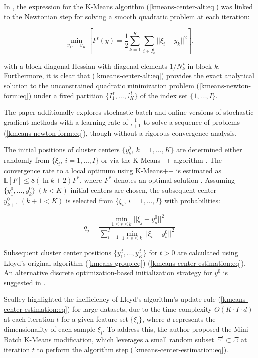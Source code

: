 In \cite{Bottou_1994}, the expression for the K-Means algorithm (\ref{kmeans-center-alt:eq}) was linked to the Newtonian step for solving a smooth quadratic problem at each iteration:

\begin{equation}
    \label{kmeans-newton-form:eq}
    \min_{y_1,\ldots,y_K}\left[F^t(y) = \frac{1}{2} \sum_{k=1}^K \sum_{i \in I_k^t} || \xi_i - y_k ||^2\right].
\end{equation}

\noindent with a block diagonal Hessian with diagonal elements $1/N_k^{\,t}$ in block $k$. Furthermore, it is clear that (\ref{kmeans-center-alt:eq}) provides the exact analytical solution to the unconstrained quadratic minimization problem (\ref{kmeans-newton-form:eq}) under a fixed partition $\{I_1^{\,t},\ldots,I_K^{\,t}\}$ of the index set $\{1,\ldots,I\}$.

The paper additionally explores stochastic batch and online versions of stochastic gradient methods with a learning rate of $\frac{1}{t + 1}$ to solve a sequence of problems (\ref{kmeans-newton-form:eq}), though without a rigorous convergence analysis.

The initial positions of cluster centers $\{ y_k^0, \> k = 1, \ldots, K \}$ are determined either randomly from $\{ \xi_i, \> i = 1, \ldots, I \}$ or via the K-Means++ algorithm \cite{Arthur_Vassilvitskii_2007,Nguyen_Duong_2018}. The convergence rate to a local optimum using K-Means++ is estimated as $\mathbb{E} [F] \leq 8(\ln k + 2 ) F^{*}$, where $F^{*}$ denotes an optimal solution \cite{Arthur_Vassilvitskii_2007}. Assuming $\{ y_1^0, \ldots, y_k^0 \} \> (k<K)$ initial centers are chosen, the subsequent center $y_{k+1}^0 \> (k+1<K)$ is selected from $\{ \xi_i, \> i = 1, \ldots, I \}$ with probabilities:

\begin{equation}
    \label{kmeans-plus-plus-init:eq}
    q_j = \frac{\min_{1 \leq s \leq k} || \xi_j - y_s^0 ||^2}{\sum_{i=1}^I \min_{1 \leq s \leq k} || \xi_i - y_s^0 ||^2}
\end{equation}

Subsequent cluster center positions $\{ y_1^{\,t}, \ldots, y_K^{\,t} \}$ for $t > 0$ are calculated using Lloyd's original algorithm (\ref{kmeans-group:eq})-(\ref{kmeans-center-estimation:eq}). An alternative discrete optimization-based initialization strategy for $y^{0}$ is suggested in \cite[Sec. 4, Stage 1]{Kuzmenko_Uryasev_2019}.

Sculley \cite{Sculley_2010} highlighted the inefficiency of Lloyd's algorithm's update rule (\ref{kmeans-center-estimation:eq}) for large datasets, due to the time complexity $O(K \cdot I \cdot d)$ at each iteration $t$ for a given feature set $\{ \xi_i \}$, where $d$ represents the dimensionality of each sample $\xi_i$. To address this, the author proposed the Mini-Batch K-Means modification, which leverages a small random subset $\Xi^{t}\subset \Xi$ at iteration $t$ to perform the algorithm step (\ref{kmeans-center-estimation:eq}).

